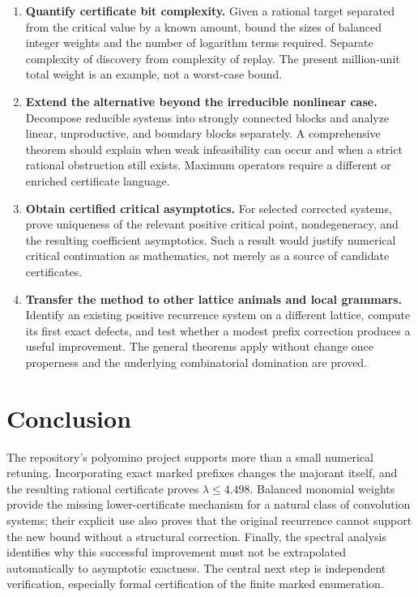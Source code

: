 \documentclass[11pt,a4paper]{article}
\theoremstyle{definition}
\theoremstyle{remark}
\begin{document}
\begin{enumerate}[label=\textbf{\arabic*.},leftmargin=2em]
\item \textbf{Quantify certificate bit complexity.}
Given a rational target separated from the critical value by a known amount,
bound the sizes of balanced integer weights and the number of logarithm
terms required. Separate complexity of discovery from complexity of replay.
The present million-unit total weight is an example, not a worst-case bound.

\item \textbf{Extend the alternative beyond the irreducible nonlinear case.}
Decompose reducible systems into strongly connected blocks and analyze
linear, unproductive, and boundary blocks separately. A comprehensive theorem
should explain when weak infeasibility can occur and when a strict rational
obstruction still exists. Maximum operators require a different or enriched
certificate language.

\item \textbf{Obtain certified critical asymptotics.}
For selected corrected systems, prove uniqueness of the relevant positive
critical point, nondegeneracy, and the resulting coefficient asymptotics.
Such a result would justify numerical critical continuation as mathematics,
not merely as a source of candidate certificates.

\item \textbf{Transfer the method to other lattice animals and local grammars.}
Identify an existing positive recurrence system on a different lattice,
compute its first exact defects, and test whether a modest prefix correction
produces a useful improvement. The general theorems apply without change
once properness and the underlying combinatorial domination are proved.
\end{enumerate}

\section{Conclusion}
The repository's polyomino project supports more than a small numerical
retuning. Incorporating exact marked prefixes changes the majorant itself,
and the resulting rational certificate proves $\lambda\leq4.498$.
Balanced monomial weights provide the missing lower-certificate mechanism
for a natural class of convolution systems; their explicit use also proves
that the original recurrence cannot support the new bound without a
structural correction. Finally, the spectral analysis identifies why this
successful improvement must not be extrapolated automatically to asymptotic
exactness. The central next step is independent verification, especially
formal certification of the finite marked enumeration.
\end{document}
